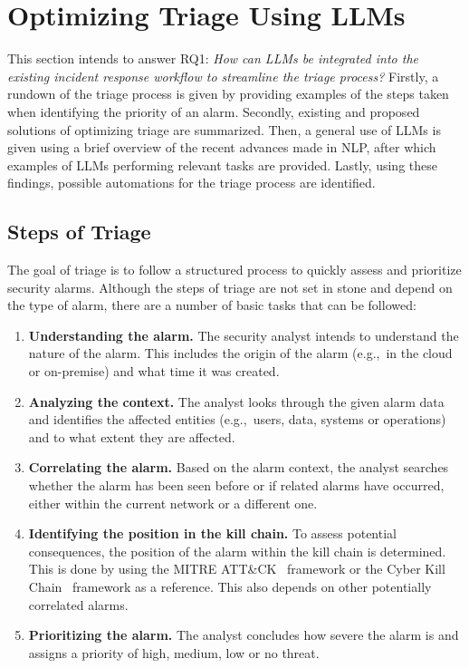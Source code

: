 \section{Optimizing Triage Using LLMs}
\label{sec:rq1}

This section intends to answer RQ1:
\textit{How can LLMs be integrated into the existing incident response workflow to streamline the triage process?}
Firstly, a rundown of the triage process is given by providing examples of the steps taken when identifying the priority
of an alarm.
Secondly, existing and proposed solutions of optimizing triage are summarized.
Then, a general use of LLMs is given using a brief overview of the recent advances made in NLP, after which examples
of LLMs performing relevant tasks are provided.
Lastly, using these findings, possible automations for the triage process are identified.

\subsection{Steps of Triage}
\label{subsec:rq1-steps-of-triage}

The goal of triage is to follow a structured process to quickly assess and prioritize security alarms.
Although the steps of triage are not set in stone and depend on the type of alarm, there are a number of basic tasks
that can be followed:
\begin{enumerate}
    \item \textbf{Understanding the alarm.}
    The security analyst intends to understand the nature of the alarm.
    This includes the origin of the alarm (e.g.,\ in the cloud or on-premise) and what time it was created.
    \item \textbf{Analyzing the context.}
    The analyst looks through the given alarm data and identifies the affected entities (e.g.,\ users, data, systems or
    operations) and to what extent they are affected.
    \item \textbf{Correlating the alarm.}
    Based on the alarm context, the analyst searches whether the alarm has been seen before or if related alarms have
    occurred, either within the current network or a different one.
    \item \textbf{Identifying the position in the kill chain.}
    To assess potential consequences, the position of the alarm within the kill chain is determined.
    This is done by using the MITRE ATT\&CK\ \citep{strom2018mitre} framework or the Cyber Kill
    Chain\ \citep{lockheed2011ckc} framework as a reference.
    This also depends on other potentially correlated alarms.
    \item \textbf{Prioritizing the alarm.}
    The analyst concludes how severe the alarm is and assigns a priority of high, medium, low or no threat.
\end{enumerate}

